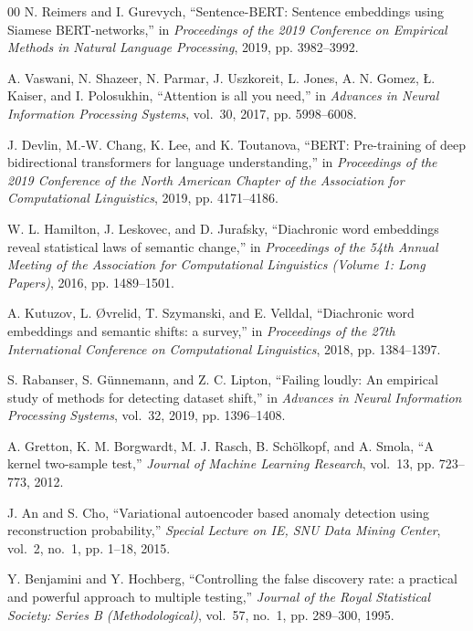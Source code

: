 \documentclass[conference]{IEEEtran}
\begin{document}
\begin{thebibliography}{00}
N. Reimers and I. Gurevych,
``Sentence-BERT: Sentence embeddings using Siamese BERT-networks,''
in \textit{Proceedings of the 2019 Conference on Empirical Methods in Natural Language Processing}, 2019, pp. 3982--3992.

A. Vaswani, N. Shazeer, N. Parmar, J. Uszkoreit, L. Jones, A. N. Gomez, Ł. Kaiser, and I. Polosukhin,
``Attention is all you need,''
in \textit{Advances in Neural Information Processing Systems}, vol.~30, 2017, pp. 5998--6008.

J. Devlin, M.-W. Chang, K. Lee, and K. Toutanova,
``BERT: Pre-training of deep bidirectional transformers for language understanding,''
in \textit{Proceedings of the 2019 Conference of the North American Chapter of the Association for Computational Linguistics}, 2019, pp. 4171--4186.

W. L. Hamilton, J. Leskovec, and D. Jurafsky,
``Diachronic word embeddings reveal statistical laws of semantic change,''
in \textit{Proceedings of the 54th Annual Meeting of the Association for Computational Linguistics (Volume 1: Long Papers)}, 2016, pp. 1489--1501.

A. Kutuzov, L. Øvrelid, T. Szymanski, and E. Velldal,
``Diachronic word embeddings and semantic shifts: a survey,''
in \textit{Proceedings of the 27th International Conference on Computational Linguistics}, 2018, pp. 1384--1397.

S. Rabanser, S. Günnemann, and Z. C. Lipton,
``Failing loudly: An empirical study of methods for detecting dataset shift,''
in \textit{Advances in Neural Information Processing Systems}, vol.~32, 2019, pp. 1396--1408.

A. Gretton, K. M. Borgwardt, M. J. Rasch, B. Schölkopf, and A. Smola,
``A kernel two-sample test,''
\textit{Journal of Machine Learning Research}, vol.~13, pp. 723--773, 2012.

J. An and S. Cho,
``Variational autoencoder based anomaly detection using reconstruction probability,''
\textit{Special Lecture on IE, SNU Data Mining Center}, vol.~2, no.~1, pp. 1--18, 2015.

Y. Benjamini and Y. Hochberg,
``Controlling the false discovery rate: a practical and powerful approach to multiple testing,''
\textit{Journal of the Royal Statistical Society: Series B (Methodological)}, vol.~57, no.~1, pp. 289--300, 1995.


\end{thebibliography}
\end{document}
